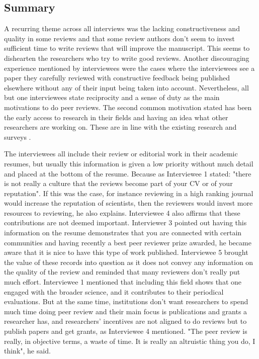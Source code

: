 \subsection{Summary}

A recurring theme across all interviews was the lacking constructiveness and quality in some reviews and that some review authors don't seem to invest sufficient time to write reviews that will improve the manuscript. This seems to dishearten the researchers who try to write good reviews. Another discouraging experience mentioned by interviewees were the cases where the interviewees see a paper they carefully reviewed with constructive feedback being published elsewhere without any of their input being taken into account. Nevertheless, all but one interviewees state reciprocity and a sense of duty as the main motivations to do peer reviews. The second common motivation stated has been the early access to research in their fields and having an idea what other researchers are working on. These are in line with the existing research and surveys \parencite{Publons.2018, Taylor&Francis.2015, Ware.2008, Squazzoni.2013}. 

The interviewees all include their review or editorial work in their academic resumes, but usually this information is given a low priority without much detail and placed at the bottom of the resume. Because as Interviewee 1 stated: "there is not really a culture that the reviews become part of your CV or of your reputation". If this was the case, for instance reviewing in a high ranking journal would increase the reputation of scientists, then the reviewers would invest more resources to reviewing, he also explains. Interviewee 4 also affirms that these contributions are not deemed important. Interviewer 3 pointed out having this information on the resume demonstrates that you are connected with certain communities and having recently a best peer reviewer prize awarded, he became aware that it is nice to have this type of work published. Interviewee 5 brought the value of these records into question as it does not convey any information on the quality of the review and reminded that many reviewers don't really put much effort. Interviewee 1 mentioned that including this field shows that one engaged with the broader science, and it contributes to their periodical evaluations. But at the same time, institutions don't want researchers to spend much time doing peer review and their main focus is publications and grants a researcher has, and researchers' incentives are not aligned to do reviews but to publish papers and get grants, as Interviewee 4 mentioned. "The peer review is really, in objective terms, a waste of time. It is really an altruistic thing you do, I think", he said.

